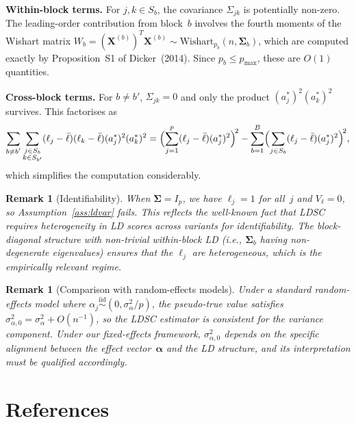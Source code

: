 \documentclass[11pt]{article}
\newcommand{\X}{\bm{X}}
\newcommand{\bSig}{\bm{\Sigma}}
\newcommand{\bal}{\bm{\alpha}}
\newtheorem{remark}[theorem]{Remark}
\begin{document}
\medskip\noindent\textbf{Within-block terms.}\;
For $j,k\in S_b$, the covariance $\Sigma_{jk}$ is potentially non-zero.  The
leading-order contribution from block~$b$ involves the fourth moments of the
Wishart matrix $W_b=(\X^{(b)})^{T}\X^{(b)}\sim\text{Wishart}_{p_b}(n,\bSig_b)$,
which are computed exactly by Proposition~S1 of Dicker~(2014).  Since
$p_b\le p_{\max}$, these are $O(1)$ quantities.

\medskip\noindent\textbf{Cross-block terms.}\;
For $b\ne b'$, $\Sigma_{jk}=0$ and only the product $(a_j^{*})^{2}(a_k^{*})^{2}$
survives.  This factorises as
\[
  \sum_{\substack{b\ne b'}}\sum_{\substack{j\in S_b\\k\in S_{b'}}}
  (\ell_j-\bar\ell)(\ell_k-\bar\ell)(a_j^{*})^{2}(a_k^{*})^{2}
  = \Bigl(\sum_{j=1}^{p}(\ell_j-\bar\ell)(a_j^{*})^{2}\Bigr)^{\!2}
    - \sum_{b=1}^{B}\Bigl(\sum_{j\in S_b}(\ell_j-\bar\ell)(a_j^{*})^{2}\Bigr)^{\!2},
\]
which simplifies the computation considerably.

\begin{remark}[Identifiability]\label{rem:identity}
When $\bSig=I_p$, we have $\ell_j=1$ for all~$j$ and $V_\ell=0$, so
Assumption~\ref{ass:ldvar} fails.  This reflects the well-known fact that LDSC
requires heterogeneity in LD scores across variants for identifiability.  The
block-diagonal structure with non-trivial within-block LD (i.e., $\bSig_b$
having non-degenerate eigenvalues) ensures that the $\ell_j$ are
heterogeneous, which is the empirically relevant regime.
\end{remark}

\begin{remark}[Comparison with random-effects models]\label{rem:random}
Under a standard random-effects model where
$\alpha_j\overset{\mathrm{iid}}{\sim}(0,\sigma_\alpha^{2}/p)$, the
pseudo-true value satisfies $\sigma_{\alpha,0}^{2}=\sigma_\alpha^{2}+O(n^{-1})$,
so the LDSC estimator is consistent for the variance component.  Under our
fixed-effects framework, $\sigma_{\alpha,0}^{2}$ depends on the specific
alignment between the effect vector~$\bal$ and the LD structure, and its
interpretation must be qualified accordingly.
\end{remark}

\section*{References}
\end{document}
